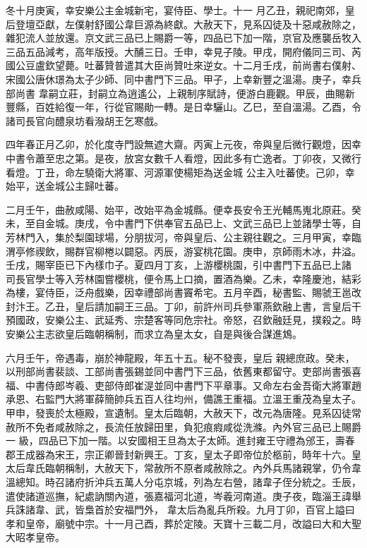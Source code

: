 \begin{pinyinscope}
 冬十月庚寅，幸安樂公主金城新宅，宴侍臣、學士。十一
 月乙丑，親祀南郊，皇后登壇亞獻，左僕射舒國公韋巨源為終獻。大赦天下，見系囚徒及十惡咸赦除之，雜犯流人並放還。京文武三品已上賜爵一等，四品已下加一階，京官及應襲岳牧入三品五品減考，高年版授。大酺三日。壬申，幸見子陵。甲戌，開府儀同三司、芮國公豆盧欽望薨。吐蕃贊普遣其大臣尚贊吐來逆女。十二月壬戌，前尚書右僕射、宋國公唐休璟為太子少師、同中書門下三品。甲子，上幸新豐之溫湯。庚子，幸兵部尚書
 韋嗣立莊，封嗣立為逍遙公，上親制序賦詩，便游白鹿觀。甲辰，曲賜新豐縣，百姓給復一年，行從官賜勛一轉。是日幸驪山。乙巳，至自溫湯。乙酉，令諸司長官向醴泉坊看潑胡王乞寒戲。



 四年春正月乙卯，於化度寺門設無遮大齋。丙寅上元夜，帝與皇后微行觀燈，因幸中書令蕭至忠之第。是夜，放宮女數千人看燈，因此多有亡逸者。丁卯夜，又微行看燈。丁丑，命左驍衛大將軍、河源軍使楊矩為送金城
 公主入吐蕃使。己卯，幸始平，送金城公主歸吐蕃。



 二月壬午，曲赦咸陽、始平，改始平為金城縣。便幸長安令王光輔馬嵬北原莊。癸未，至自金城。庚戌，令中書門下供奉官五品已上、文武三品已上並諸學士等，自芳林門入，集於梨園球場，分朋拔河，帝與皇后、公主親往觀之。三月甲寅，幸臨渭亭修禊飲，賜群官柳棬以闢惡。丙辰，游宴桃花園。庚申，京師雨木冰，井溢。壬戌，賜宰臣已下內樣巾子。夏四月丁亥，上游櫻桃園，引中書門下五品已上諸
 司長官學士等入芳林園嘗櫻桃，便令馬上口摘，置酒為樂。乙未，幸隆慶池，結彩為樓，宴侍臣，泛舟戲樂，因幸禮部尚書竇希宅。五月辛酉，秘書監、賜虢王邕改封汴王。乙丑，皇后請加嗣王三品。丁卯，前許州司兵參軍燕欽融上書，言皇后干預國政，安樂公主、武延秀、宗楚客等同危宗社。帝怒，召欽融廷見，撲殺之。時安樂公主志欲皇后臨朝稱制，而求立為皇太女，自是與後合謀進鴆。



 六月壬午，帝遇毒，崩於神龍殿，年五十五。秘不發喪，皇后
 親總庶政。癸未，以刑部尚書裴談、工部尚書張錫並同中書門下三品，依舊東都留守。吏部尚書張喜福、中書侍郎岑羲、吏部侍郎崔湜並同中書門下平章事。又命左右金吾衛大將軍趙承恩、右監門大將軍薛簡帥兵五百人往均州，備譙王重福。立溫王重茂為皇太子。甲申，發喪於太極殿，宣遺制。皇太后臨朝，大赦天下，改元為唐隆。見系囚徒常赦所不免者咸赦除之，長流任放歸田里，負犯痕瘕咸從洗滌。內外官三品已上賜爵一
 級，四品已下加一階。以安國相王旦為太子太師。進封雍王守禮為邠王，壽春郡王成器為宋王，宗正卿晉封新興王。丁亥，皇太子即帝位於柩前，時年十六。皇太后韋氏臨朝稱制，大赦天下，常赦所不原者咸赦除之。內外兵馬諸親掌，仍令韋溫總知。時召諸府折沖兵五萬人分屯京城，列為左右營，諸韋子侄分統之。壬辰，遣使諸道巡撫，紀處訥關內道，張嘉福河北道，岑羲河南道。庚子夜，臨淄王諱舉兵誅諸韋、武，皆梟首於安福門外，
 韋太后為亂兵所殺。九月丁卯，百官上謚曰孝和皇帝，廟號中宗。十一月己酉，葬於定陵。天寶十三載二月，改謚曰大和大聖大昭孝皇帝。




\end{pinyinscope}
